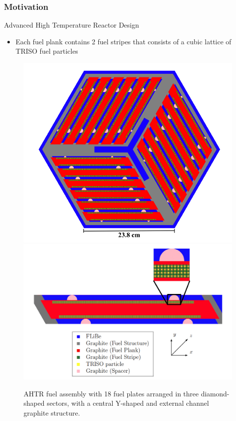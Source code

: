 \begin{frame}
  \frametitle{Motivation}
  \begin{block}{Advanced High Temperature Reactor Design}
    \begin{itemize}
      \item Each fuel plank contains 2 fuel stripes that consists of a cubic 
      lattice of TRISO fuel particles
    \end{itemize}
  \end{block}
  \begin{figure}[]
    \includegraphics[width=0.5\linewidth]{figures/ahtr-assembly.png} 
    \includegraphics[width=0.5\linewidth]{figures/ahtr-plank.png} 
    \caption{\acrfull{AHTR} fuel assembly with 18 fuel plates arranged in 
    three diamond-shaped sectors, with a central Y-shaped and external channel 
    graphite structure.}
\end{figure}
\end{frame}

